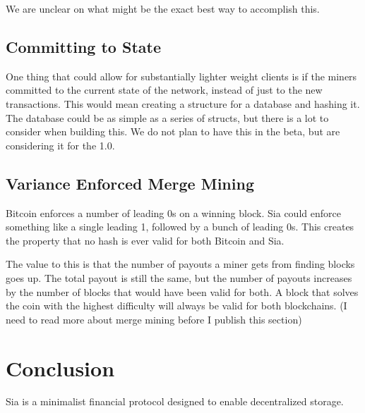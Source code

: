 \documentclass[twocolumn]{article}
\begin{document}
We are unclear on what might be the exact best way to accomplish this.

\subsection{Committing to State}
One thing that could allow for substantially lighter weight clients is if the miners committed to the current state of the network, instead of just to the new transactions.
This would mean creating a structure for a database and hashing it.
The database could be as simple as a series of structs, but there is a lot to consider when building this.
We do not plan to have this in the beta, but are considering it for the 1.0.

\subsection{Variance Enforced Merge Mining}
Bitcoin enforces a number of leading 0s on a winning block.
Sia could enforce something like a single leading 1, followed by a bunch of leading 0s.
This creates the property that no hash is ever valid for both Bitcoin and Sia.

The value to this is that the number of payouts a miner gets from finding blocks goes up.
The total payout is still the same, but the number of payouts increases by the number of blocks that would have been valid for both.
A block that solves the coin with the highest difficulty will always be valid for both blockchains.
(I need to read more about merge mining before I publish this section)

\section{Conclusion}
Sia is a minimalist financial protocol designed to enable decentralized storage.



\end{document}
